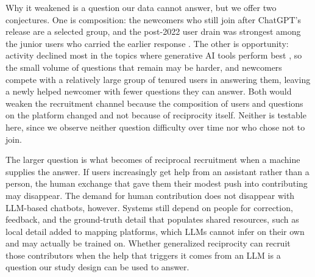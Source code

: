 Why it weakened is a question our data cannot answer, but we offer two conjectures. One is composition: the newcomers who still join after ChatGPT's release are a selected group, and the post-2022 user drain was strongest among the junior users who carried the earlier response \citep{burtch_consequences_2024}. The other is opportunity: activity declined most in the topics where generative AI tools perform best \citep{delriochanona_large_2024}, so the small volume of questions that remain may be harder, and newcomers compete with a relatively large group of tenured users in answering them, leaving a newly helped newcomer with fewer questions they can answer. Both would weaken the recruitment channel because the composition of users and questions on the platform changed and not because of reciprocity itself. Neither is testable here, since we observe neither question difficulty over time nor who chose not to join.

The larger question is what becomes of reciprocal recruitment when a machine supplies the answer. If users increasingly get help from an assistant rather than a person, the human exchange that gave them their modest push into contributing may disappear. The demand for human contribution does not disappear with LLM-based chatbots, however. Systems still depend on people for correction, feedback, and the ground-truth detail that populates shared resources, such as local detail added to mapping platforms, which LLMs cannot infer on their own and may actually be trained on. Whether generalized reciprocity can recruit those contributors when the help that triggers it comes from an LLM is a question our study design can be used to answer.

